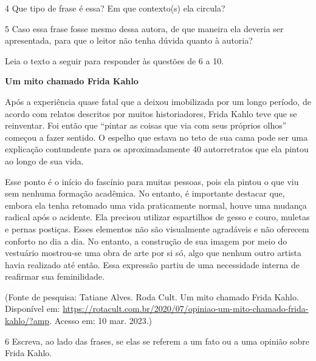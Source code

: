 

\num{4} Que tipo de frase é essa? Em que contexto(s) ela circula?



\num{5} Caso essa frase fosse mesmo dessa autora, de que maneira ela
deveria ser apresentada, para que o leitor não tenha dúvida quanto à
autoria?



Leia o texto a seguir para responder às questões de 6 a 10.

\textbf{Um mito chamado Frida Kahlo}

Após a experiência quase fatal que a deixou imobilizada por um longo
período, de acordo com relatos descritos por muitos historiadores, Frida
Kahlo teve que se reinventar. Foi então que ``pintar as coisas que via
com seus próprios olhos'' começou a fazer sentido. O espelho que estava
no teto de sua cama pode ser uma explicação contundente para os
aproximadamente 40 autorretratos que ela pintou ao longo de sua vida.

Esse ponto é o início do fascínio para muitas pessoas, pois ela pintou o
que viu sem nenhuma formação acadêmica. No entanto, é importante
destacar que, embora ela tenha retomado uma vida praticamente normal,
houve uma mudança radical após o acidente. Ela precisou utilizar
espartilhos de gesso e couro, muletas e pernas postiças. Esses elementos
não são visualmente agradáveis e não oferecem conforto no dia a dia. No
entanto, a construção de sua imagem por meio do vestuário mostrou-se uma
obra de arte por si só, algo que nenhum outro artista havia realizado
até então. Essa expressão partiu de uma necessidade interna de reafirmar
sua feminilidade.

(Fonte de pesquisa: Tatiane Alves. Roda Cult. Um mito chamado Frida
Kahlo. Disponível em:
\url{https://rotacult.com.br/2020/07/opiniao-um-mito-chamado-frida-kahlo/?amp}.
Acesso em: 10 mar. 2023.)

\num{6} Escreva, ao lado das frases, se elas se referem a um fato ou a
uma opinião sobre Frida Kahlo.


